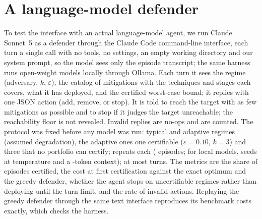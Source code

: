 \documentclass[conference,compsoc]{IEEEtran}
\begin{document}
\section{A language-model defender}\label{sec:llm}
To test the interface with an actual language-model agent, we run Claude Sonnet~5 as a
defender through the Claude Code command-line interface, each turn a single call with no
tools, no settings, an empty working directory and our system prompt, so the model sees
only the episode transcript; the same harness runs open-weight models locally through
Ollama. Each turn it sees the regime
(adversary, $k$, $\varepsilon$), the catalog of mitigations with the techniques and
stages each covers, what it has deployed, and the certified worst-case bound; it replies
with one JSON action (add, remove, or stop). It is told to reach the target with as few
mitigations as possible and to stop if it judges the target unreachable; the
reachability floor is not revealed. Invalid replies are no-ops and are counted. The
protocol was fixed before any model was run: \LlmTypical{} typical and \LlmAdaptive{}
adaptive regimes (assumed degradation), the adaptive ones one certifiable
($\varepsilon{=}0.10$, $k{=}3$) and three that no portfolio can certify;
\LlmSeeds{} repeats each (\LlmEpisodes{} episodes; for local models, seeds at temperature
\LlmTemperature{} and a \LlmContext-token context); at most \LlmMaxSteps{} turns. The metrics are the share of
episodes certified, the cost at first certification against the exact optimum and the
greedy defender, whether the agent stops on uncertifiable regimes rather than deploying
until the turn limit, and the rate of invalid actions. Replaying the greedy defender
through the same text interface reproduces its benchmark costs exactly, which checks the
harness.

\end{document}
